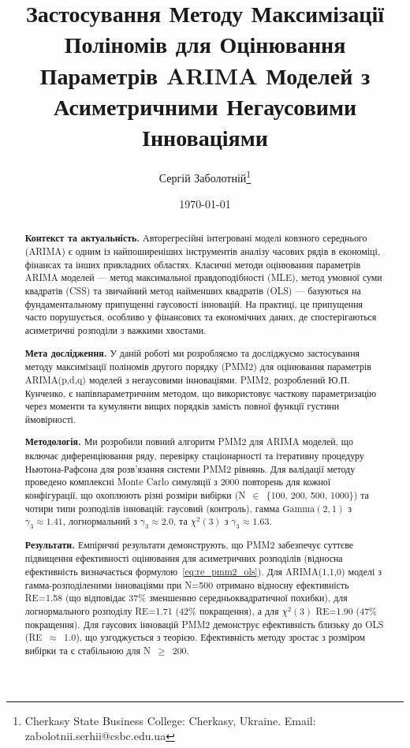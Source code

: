 \documentclass[12pt,a4paper]{article}
\title{Застосування Методу Максимізації Поліномів для Оцінювання Параметрів ARIMA Моделей з Асиметричними Негаусовими Інноваціями}
\author{Сергій Заболотній\thanks{Cherkasy State Business College: Cherkasy, Ukraine. Email: zabolotnii.serhii@csbc.edu.ua}}
\date{\today}
\newcommand{\Gammadist}{\text{Gamma}}
\begin{document}
\maketitle

\begin{abstract}

\textbf{Контекст та актуальність.} Авторегресійні інтегровані моделі ковзного середнього (ARIMA) є одним із найпоширеніших інструментів аналізу часових рядів в економіці, фінансах та інших прикладних областях. Класичні методи оцінювання параметрів ARIMA моделей --- метод максимальної правдоподібності (MLE), метод умовної суми квадратів (CSS) та звичайний метод найменших квадратів (OLS) --- базуються на фундаментальному припущенні гаусовості інновацій. На практиці, це припущення часто порушується, особливо у фінансових та економічних даних, де спостерігаються асиметричні розподіли з важкими хвостами.

\textbf{Мета дослідження.} У даній роботі ми розробляємо та досліджуємо застосування методу максимізації поліномів другого порядку (PMM2) для оцінювання параметрів ARIMA(p,d,q) моделей з негаусовими інноваціями. PMM2, розроблений Ю.П. Кунченко, є напівпараметричним методом, що використовує часткову параметризацію через моменти та кумулянти вищих порядків замість повної функції густини ймовірності.

\textbf{Методологія.} Ми розробили повний алгоритм PMM2 для ARIMA моделей, що включає диференціювання ряду, перевірку стаціонарності та ітеративну процедуру Ньютона-Рафсона для розв'язання системи PMM2 рівнянь. Для валідації методу проведено комплексні Monte Carlo симуляції з 2000 повторень для кожної конфігурації, що охоплюють різні розміри вибірки (N~$\in$~\{100, 200, 500, 1000\}) та чотири типи розподілів інновацій: гаусовий (контроль), гамма $\Gammadist(2,1)$ з $\gamma_3 \approx 1.41$, логнормальний з $\gamma_3 \approx 2.0$, та $\chi^2(3)$ з $\gamma_3 \approx 1.63$.

\textbf{Результати.} Емпіричні результати демонструють, що PMM2 забезпечує суттєве підвищення ефективності оцінювання для асиметричних розподілів (відносна ефективність визначається формулою~\eqref{eq:re_pmm2_ols}). Для ARIMA(1,1,0) моделі з гамма-розподіленими інноваціями при N=500 отримано відносну ефективність RE=1.58 (що відповідає 37\% зменшенню середньоквадратичної похибки), для логнормального розподілу RE=1.71 (42\% покращення), а для $\chi^2(3)$ RE=1.90 (47\% покращення). Для гаусових інновацій PMM2 демонструє ефективність близьку до OLS (RE~$\approx$~1.0), що узгоджується з теорією. Ефективність методу зростає з розміром вибірки та є стабільною для N~$\geq$~200.


\end{abstract}
\end{document}
